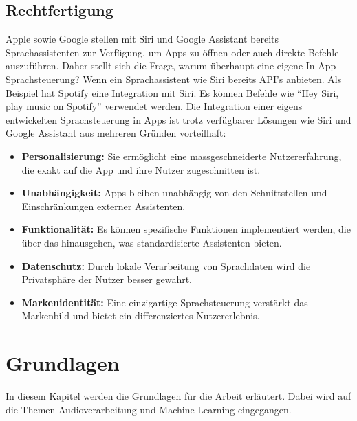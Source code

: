 \documentclass[11pt,a4paper]{article}
\begin{document}
\subsection{Rechtfertigung}
Apple sowie Google stellen mit Siri und Google Assistant bereits Sprachassistenten zur 
Verfügung, um Apps zu öffnen oder auch direkte Befehle auszuführen. Daher stellt sich die Frage, 
warum überhaupt eine eigene In App Sprachsteuerung? Wenn ein Sprachassistent wie Siri bereits 
API's anbieten. Als Beispiel hat Spotify eine Integration mit Siri. Es können Befehle wie 
``Hey Siri, play music on Spotify'' verwendet werden. Die Integration einer eigens entwickelten 
Sprachsteuerung in Apps ist trotz verfügbarer Lösungen wie Siri und Google Assistant aus mehreren 
Gründen vorteilhaft:


\begin{itemize}[itemsep=0pt, parsep=0pt]
    \item \textbf{Personalisierung:} Sie ermöglicht eine massgeschneiderte Nutzererfahrung, die 
	exakt auf die App und ihre Nutzer zugeschnitten ist.
    \item \textbf{Unabhängigkeit:} Apps bleiben unabhängig von den Schnittstellen und 
	Einschränkungen externer Assistenten.
    \item \textbf{Funktionalität:} Es können spezifische Funktionen implementiert werden, die über 
	das hinausgehen, was standardisierte Assistenten bieten.
    \item \textbf{Datenschutz:} Durch lokale Verarbeitung von Sprachdaten wird die Privatsphäre der 
	Nutzer besser gewahrt.
    \item \textbf{Markenidentität:} Eine einzigartige Sprachsteuerung verstärkt das Markenbild und 
	bietet ein differenziertes Nutzererlebnis.
\end{itemize}

\noindent 

\newpage \section{Grundlagen}\label{sec:grundlagen}
In diesem Kapitel werden die Grundlagen für die Arbeit erläutert. Dabei wird auf die Themen
Audioverarbeitung und Machine Learning eingegangen.
\end{document}
